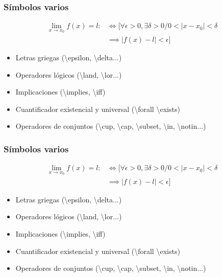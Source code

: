 \begin{frame}[fragile]
    \frametitle{Símbolos varios}
        \begin{align*}
            \lim_{x\to x_{0}}f(x) = l :&\iff \Big[  \forall\epsilon>0, \exists\delta>0 \Big/ 0<\left|x-x_0\right|<\delta \\
            &\implies \left|f(x)-l\right| <\epsilon \Big]
        \end{align*}
        \begin{itemize}
            \item{Letras griegas (\textbackslash epsilon, \textbackslash delta...)}
            \item{Operadores lógicos (\textbackslash land, \textbackslash lor...)}
            \item{Implicaciones (\textbackslash implies, \textbackslash iff)}
            \item{Cuantificador existencial y universal (\textbackslash forall \textbackslash exists)}
            \item{Operadores de conjuntos (\textbackslash cup, \textbackslash cap, \textbackslash subset, \textbackslash in, \textbackslash notin...)}
        \end{itemize}
\end{frame}

\begin{frame}[fragile]
    \frametitle{Símbolos varios}
        \begin{align*}
            \lim_{x\to x_{0}}f(x) = l :&\iff \Big[  \forall\epsilon>0, \exists\delta>0 \Big/ 0<\left|x-x_0\right|<\delta \\
            &\implies \left|f(x)-l\right| <\epsilon \Big]
        \end{align*}
        \begin{itemize}
            \item{Letras griegas (\textbackslash epsilon, \textbackslash delta...)}
            \item{Operadores lógicos (\textbackslash land, \textbackslash lor...)}
            \item{Implicaciones (\textbackslash implies, \textbackslash iff)}
            \item{Cuantificador existencial y universal (\textbackslash forall \textbackslash exists)}
            \item{Operadores de conjuntos (\textbackslash cup, \textbackslash cap, \textbackslash subset, \textbackslash in, \textbackslash notin...)}
        \end{itemize}
\end{frame}

